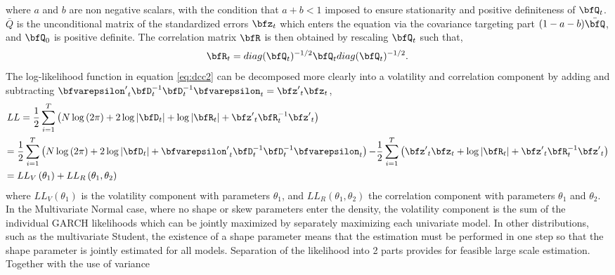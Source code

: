 where $a$ and $b$ are non negative scalars, with the condition that $a + b < 1$
imposed to ensure stationarity and positive definiteness of $\bfQ_t$. $\bar Q$
is the unconditional matrix of the standardized errors $\bfz_t$ which enters the
equation via the covariance targeting part $(1-a-b)\bar \bfQ$, and $\bfQ_0$ is
positive definite. The correlation matrix $\bfR$ is then obtained by rescaling
$\bfQ_t$ such that,
\begin{equation}\label{eq:dcc6}
{\bfR_t} = diag{({\bfQ_t})^{ - 1/2}}{\bfQ_t}diag{({\bfQ_t})^{ - 1/2}}.
\end{equation}
The log-likelihood function in equation \eqref{eq:dcc2} can be
decomposed more clearly into a volatility and correlation component by adding and
subtracting ${{{\bfvarepsilon '}_t}\bfD_t^{ - 1}\bfD_t^{ - 1}{\bfvarepsilon _t}}={{{\bfz'}_t}{\bfz_t}}$,
\begin{equation}
\begin{gathered}
  LL = \frac{1}
{2}\sum\limits_{i = 1}^T {\left( {N\log \left( {2\pi } \right) + 2\log \left| {{\bfD_t}} \right| + \log \left| {{\bfR_t}} \right| + {{\bfz'}_t}\bfR_t^{ - 1}{{\bfz'}_t}} \right)}  \hfill \\
   = \frac{1}
{2}\sum\limits_{i = 1}^T {\left( {N\log \left( {2\pi } \right) + 2\log \left| {{\bfD_t}} \right| + {{\bfvarepsilon '}_t}\bfD_t^{ - 1}\bfD_t^{ - 1}{\bfvarepsilon _t}} \right) - } \frac{1}
{2}\sum\limits_{i = 1}^T {\left( {{{\bfz'}_t}{\bfz_t} + \log \left| {{\bfR_t}} \right| + {{\bfz'}_t}\bfR_t^{ - 1}{{\bfz'}_t}} \right)}  \hfill \\
   = {LL_V}\left( {{\theta _1}} \right) + {LL_R}\left( {{\theta _1},{\theta _2}} \right) \hfill \\
\end{gathered}
\end{equation}
where ${LL_V}\left( {{\theta _1}} \right)$ is the volatility component with
parameters $\theta_1$, and ${LL_R}\left( {{\theta _1},{\theta _2}} \right)$ the
correlation component with parameters $\theta_1$ and $\theta_2$. In the Multivariate
Normal case, where no shape or skew parameters enter the density, the volatility
component is the sum of the individual GARCH likelihoods which can be jointly
maximized by separately maximizing each univariate model. In other distributions,
such as the multivariate Student, the existence of a shape parameter means that
the estimation must be performed in one step so that the shape parameter is
jointly estimated for all models. Separation of the likelihood into 2 parts
provides for feasible large scale estimation. Together with the use of variance
